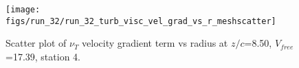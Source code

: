 \begin{figure}[H]
\centering
\texttt{[image: figs/run\_32/run\_32\_turb\_visc\_vel\_grad\_vs\_r\_meshscatter]}
\caption{Scatter plot of $\nu_T$ velocity gradient term vs radius at $z/c$=8.50, $V_{free}$=17.39, station 4.}
\label{fig:run_32_turb_visc_vel_grad_vs_r_meshscatter}
\end{figure}


